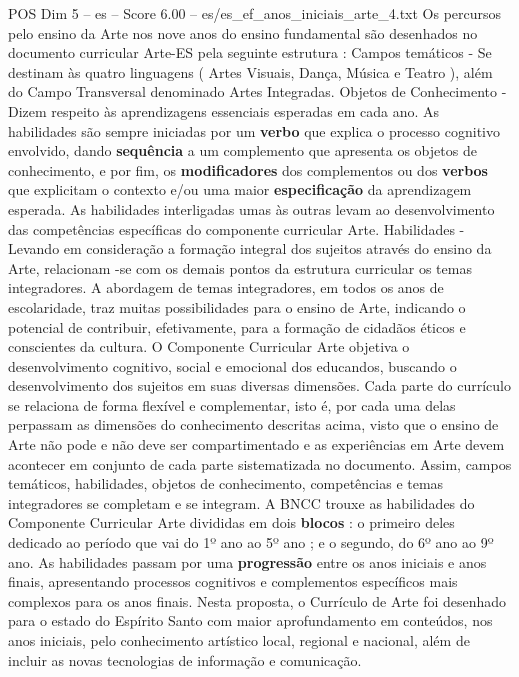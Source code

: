 \begin{textsample}{POS Dim 5 – es – Score 6.00 – es/es\_ef\_anos\_iniciais\_arte\_4.txt}  \label{ex:f5_pos_110}
Os percursos pelo ensino da Arte nos nove anos do ensino fundamental são desenhados no documento curricular Arte-ES pela seguinte estrutura : Campos temáticos - Se destinam às quatro linguagens ( Artes Visuais, Dança, Música e Teatro ), além do Campo Transversal denominado Artes Integradas.
Objetos de Conhecimento - Dizem respeito às aprendizagens essenciais esperadas em cada ano.
As habilidades são sempre iniciadas por um \textbf{verbo} que explica o processo cognitivo envolvido, dando \textbf{sequência} a um complemento que apresenta os objetos de conhecimento, e por fim, os \textbf{modificadores} dos complementos ou dos \textbf{verbos} que explicitam o contexto e/ou uma maior \textbf{especificação} da aprendizagem esperada.
As habilidades interligadas umas às outras levam ao desenvolvimento das competências específicas do componente curricular Arte.
Habilidades - Levando em consideração a formação integral dos sujeitos através do ensino da Arte, relacionam -se com os demais pontos da estrutura curricular os temas integradores.
A abordagem de temas integradores, em todos os anos de escolaridade, traz muitas possibilidades para o ensino de Arte, indicando o potencial de contribuir, efetivamente, para a formação de cidadãos éticos e conscientes da cultura.
O Componente Curricular Arte objetiva o desenvolvimento cognitivo, social e emocional dos educandos, buscando o desenvolvimento dos sujeitos em suas diversas dimensões.
Cada parte do currículo se relaciona de forma flexível e complementar, isto é, por cada uma delas perpassam as dimensões do conhecimento descritas acima, visto que o ensino de Arte não pode e não deve ser compartimentado e as experiências em Arte devem acontecer em conjunto de cada parte sistematizada no documento.
Assim, campos temáticos, habilidades, objetos de conhecimento, competências e temas integradores se completam e se integram.
A BNCC trouxe as habilidades do Componente Curricular Arte divididas em dois \textbf{blocos} : o primeiro deles dedicado ao período que vai do 1º ano ao 5º ano ; e o segundo, do 6º ano ao 9º ano.
As habilidades passam por uma \textbf{progressão} entre os anos iniciais e anos finais, apresentando processos cognitivos e complementos específicos mais complexos para os anos finais.
Nesta proposta, o Currículo de Arte foi desenhado para o estado do Espírito Santo com maior aprofundamento em conteúdos, nos anos iniciais, pelo conhecimento artístico local, regional e nacional, além de incluir as novas tecnologias de informação e comunicação.

\end{textsample}
